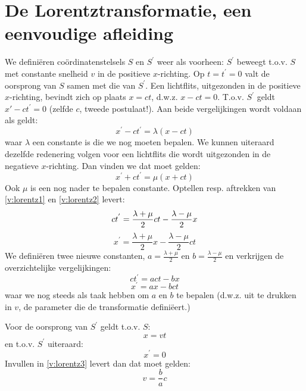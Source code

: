 \section{De Lorentztransformatie, een eenvoudige afleiding}
We defini\"{e}ren co\"{o}rdinatenstelsels $S$ en $S^{'}$ weer als voorheen:
$S^{'}$ beweegt t.o.v. $S$ met constante snelheid $v$ in de positieve 
$x$-richting.
Op $t = t^{'} = 0$ valt de oorsprong van $S$ samen met die van $S^{'}$.
Een lichtflits, uitgezonden in de positieve $x$-richting, bevindt zich op 
plaats $x = ct$, d.w.z. $x - ct = 0$.
T.o.v. $S^{'}$ geldt $x' - ct^{'} = 0$ (zelfde $c$, tweede postulaat!).
Aan beide vergelijkingen wordt voldaan als geldt:
\begin{equation}
x^{'} - ct^{'} = \lambda (x - ct)
\end{equation}
waar $\lambda$ een constante is die we nog moeten bepalen.
We kunnen uiteraard dezelfde redenering volgen voor een lichtflits die wordt 
uitgezonden in de negatieve $x$-richting.
Dan vinden we dat moet gelden:
\begin{equation}
\label{v:lorentz2}
x^{'} + ct^{'} = \mu (x + ct)
\end{equation}
Ook $\mu$ is een nog nader te bepalen constante.
Optellen resp. aftrekken van \ref{v:lorentz1} en \ref{v:lorentz2} levert:
\begin{displaymath}
ct^{'} = \frac{\lambda + \mu}{2} ct - \frac{\lambda - \mu}{2} x \\
\end{displaymath}
\begin{displaymath}
x^{'} = \frac{\lambda + \mu}{2} x - \frac{\lambda - \mu}{2} ct 
\end{displaymath}
We defini\"{e}ren twee nieuwe constanten, $a = \frac{\lambda + \mu}{2}$
en $b = \frac{\lambda - \mu}{2}$ en verkrijgen de overzichtelijke 
vergelijkingen:
\begin{equation}
\label{v:lorentz4}
ct^{'} = act - bx
\end{equation}
\begin{equation}
\label{v:lorentz3}
x^{'} = ax - bct
\end{equation}
waar we nog steeds als taak hebben om $a$ en $b$ te bepalen (d.w.z. uit te 
drukken in $v$, de parameter die de transformatie defini\"{e}ert.)

Voor de oorsprong van $S^{'}$ geldt t.o.v. $S$:
\begin{displaymath}
x = vt
\end{displaymath}
en t.o.v. $S^{'}$ uiteraard:
\begin{displaymath}
x^{'} = 0
\end{displaymath}
Invullen in \ref{v:lorentz3} levert dan dat moet gelden:
\begin{equation}
\label{v:lorentz5}
v = \frac{b}{a}c
\end{equation}

